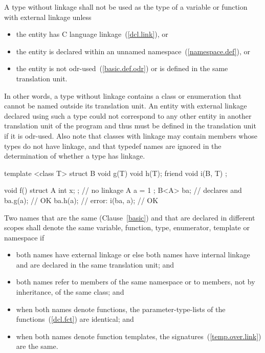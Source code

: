 A type without linkage shall not be used as the type of a variable or
function with external linkage unless
\begin{itemize}
\item the entity has C language linkage~(\ref{dcl.link}), or

\item the entity is declared within an unnamed
namespace~(\ref{namespace.def}), or

\item the entity is not odr-used~(\ref{basic.def.odr}) or is defined in
the same translation unit.
\end{itemize}
\enternote In other words, a type without linkage contains a class or enumeration that
cannot be named outside its translation unit. An entity with external linkage declared
using such a type could not correspond to any other entity in another translation unit
of the program and thus must be defined in the
translation unit if it is odr-used. Also note that classes with linkage may contain members
whose types do not have linkage, and that typedef names are ignored in the determination
of whether a type has linkage. \exitnote

\enterexample
\begin{codeblock}
template <class T> struct B {
  void g(T) { }
  void h(T);
  friend void i(B, T) { }
};

void f() {
  struct A { int x; };  // no linkage
  A a = { 1 };
  B<A> ba;              // declares  and 
  ba.g(a);              // OK
  ba.h(a);              // error: 
  i(ba, a);             // OK
}
\end{codeblock}
\exitexample

\pnum
Two names that are the same (Clause~\ref{basic}) and that are declared
in different scopes shall denote the same variable, function,
type, enumerator, template or namespace if

\begin{itemize}
\item both names have external linkage or else both names have internal
linkage and are declared in the same translation unit; and

\item both names refer to members of the same namespace or to members,
not by inheritance, of the same class; and

\item when both names denote functions, the parameter-type-lists of the
functions~(\ref{dcl.fct}) are identical; and

\item when both names denote function templates, the
signatures~(\ref{temp.over.link}) are the same.
\end{itemize}

